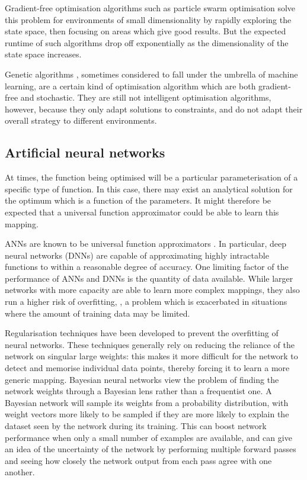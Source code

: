 \documentclass[a4paper]{article}
\begin{document}
Gradient-free optimisation algorithms such as particle swarm optimisation \cite{kennedy12} solve this problem for environments of small dimensionality
by rapidly exploring the state space, then focusing on areas which give good results.
But the expected runtime of such algorithms drop off exponentially as the dimensionality of the state space increases.

Genetic algorithms \cite{carr14}, sometimes considered to fall under the umbrella of machine learning, are a certain kind of optimisation algorithm
which are both gradient-free and stochastic.
They are still not intelligent optimisation algorithms, however, because they only adapt solutions to constraints, and do not adapt their overall strategy to different environments.

\subsection{Artificial neural networks}

At times, the function being optimised will be a particular parameterisation of a specific type of function.
In this case, there may exist an analytical solution for the optimum which is a function of the parameters.
It might therefore be expected that a universal function approximator could be able to learn this mapping.

ANNs are known to be universal function approximators \cite{hornik91}.
In particular, deep neural networks (DNNs) \cite{liang17} are capable of approximating highly intractable functions to within a reasonable degree of accuracy.
One limiting factor of the performance of ANNs and DNNs is the quantity of data available.
While larger networks with more capacity are able to learn more complex mappings, they also run a higher risk of overfitting, \cite{caruana01},
a problem which is exacerbated in situations where the amount of training data may be limited.

Regularisation techniques have been developed \cite{goodfellow16, srivastava14, ioffe15, li18} to prevent the overfitting of neural networks.
These techniques generally rely on reducing the reliance of the network on singular large weights:
this makes it more difficult for the network to detect and memorise individual data points, thereby forcing it to learn a more generic mapping.
Bayesian neural networks \cite{giryes16} view the problem of finding the network weights through a Bayesian lens rather than a frequentist one.
A Bayesian network will sample its weights from a probability distribution, with weight vectors more likely to be sampled if they are
more likely to explain the dataset seen by the network during its training.
This can boost network performance when only a small number of examples are available, and can give an idea of the uncertainty
of the network by performing multiple forward passes and seeing how closely the network output from each pass agree with one another.
\end{document}
